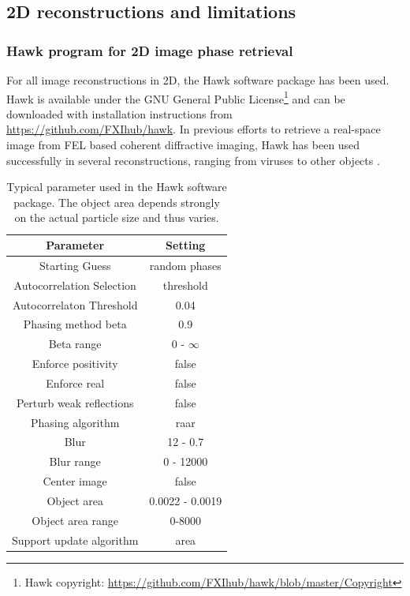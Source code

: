 \subsection{2D reconstructions and limitations}
%
%
%
\subsubsection{Hawk program for 2D image phase retrieval}
For all image reconstructions in 2D, the Hawk software package \citep{Maia-2010-JAC} has been used. Hawk is available under the GNU General Public License\footnote{Hawk copyright: \url{https://github.com/FXIhub/hawk/blob/master/Copyright}} and can be downloaded with installation instructions from \url{https://github.com/FXIhub/hawk}. In previous efforts to retrieve a real-space image from FEL based coherent diffractive imaging, Hawk has been used successfully in several reconstructions, ranging from viruses \citep{Seibert-2011-Nature,Ekeberg-2015-PRL} to other objects \citep{Seibert-2010-JPhysB}.
\begin{table}%
\centering
\begin{tabular}{ |c|c|}
 \hline
 \textbf{Parameter} & \textbf{Setting} \\ 
 \hline
 Starting Guess & random phases \\ \hline
 Autocorrelation Selection & threshold \\ \hline
 Autocorrelaton Threshold & 0.04  \\ \hline
 Phasing method beta & 0.9  \\ \hline
 Beta range & 0 - $\infty$ \\ \hline
 Enforce positivity & false   \\ \hline
 Enforce real & false     \\\hline
Perturb weak reflections & false \\ \hline
Phasing algorithm & raar \\ \hline
Blur & 12 - 0.7 \\ \hline
Blur range & 0 - 12000 \\ \hline
Center image & false \\ \hline
Object area & 0.0022 - 0.0019 \\ \hline
Object area range & 0-8000\\ \hline
Support update algorithm & area \\ \hline
\end{tabular}
\caption{Typical parameter used in the Hawk software package. The object area depends strongly on the actual particle size and thus varies.}
\label{tab:hawk-parameter}
\end{table}
